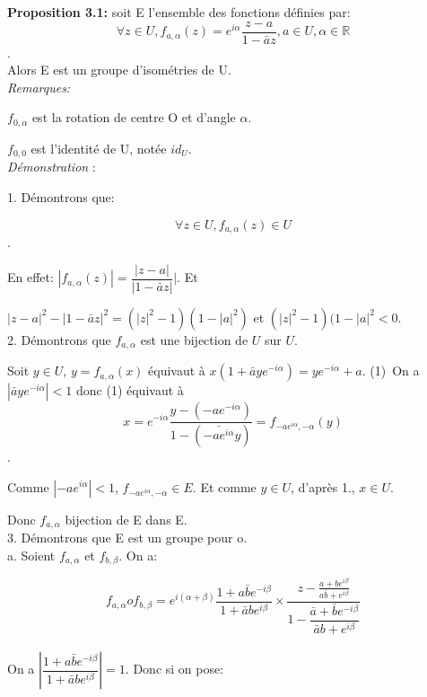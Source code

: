 \documentclass[a4paper, 12pt, twoside]{book}
\begin{document}
 \textbf{Proposition 3.1:} soit E l'ensemble des fonctions définies par:\\
 
 $$\forall z\in U, f_{a,\alpha}(z)=e^{i\alpha}\dfrac{z-a}{1-\bar{a}z}, a\in U, \alpha \in \mathbb{R}$$.\\
 
 Alors E est un groupe d'isométries de U.\\
 
 \textit{Remarques:}\
 
 $f_{0,\alpha}$ est la rotation de centre O et d'angle $\alpha$.\
 
 $f_{0,0}$ est l'identité de U, notée $id_{U}$.\\
 
 
 
 \textit{Démonstration }:\
 
 1. Démontrons que:\
 
 $$\forall z\in U, f_{a,\alpha}(z)\in U$$.\
 
 En effet: $|f_{a,\alpha}(z)|=\dfrac{|z-a|}{|1-\bar{a}z|}|$. Et\ 
 
 $|z-a|^{2}-|1-\bar{a}z|^{2}=(|z|^{2}-1)(1-|a|^{2})$ et  $(|z|^{2}-1)(1-|a|^{2}<0$.\\
 
 2.   Démontrons que $f_{a,\alpha}$ est une bijection de $U$ sur $U$.\
 
 Soit $y\in U$, $y=f_{a,\alpha}(x)$ équivaut à $x(1+\bar{a}ye^{-i\alpha})=ye^{-i\alpha}+a$. (1)\ 
 On a $|\bar{a}ye^{-i\alpha}|<1$ donc (1) équivaut à\
  $$x=e^{-i\alpha}\dfrac{y-(-ae^{-i\alpha})}{1-(\bar{-ae^{i\alpha}}y)}=f_{-ae^{i\alpha},-\alpha}(y)$$.\
  
  Comme $|-ae^{i\alpha}|<1$, $f_{-ae^{i\alpha},-\alpha}\in E$. Et comme  $y\in U$, d'après 1.,  $x\in U$.\
  
  Donc $f_{a,\alpha}$ bijection de E dans E.\\
  
  3. Démontrons que E est un groupe pour o.\\
  
   a. Soient $f_{a,\alpha}$ et $f_{b,\beta}$. On a:\
   
   $$f_{a,\alpha}of_{b,\beta}=e^{i(\alpha+\beta)}\dfrac{1+a\bar{b}e^{-i\beta}}{1+\bar{a}be^{i\beta}}\times\frac{z-\frac{a+be^{i\beta}}{a\bar{b}+e^{i\beta}}}{1-\dfrac{\bar{a}+\bar{b}e^{-i\beta}}{\bar{a}b+e^{i\beta}}}$$\\
   
   On a $|\dfrac{1+a\bar{b}e^{-i\beta}}{1+\bar{a}be^{i\beta}}|=1$. Donc si on pose:\
   
\end{document}

